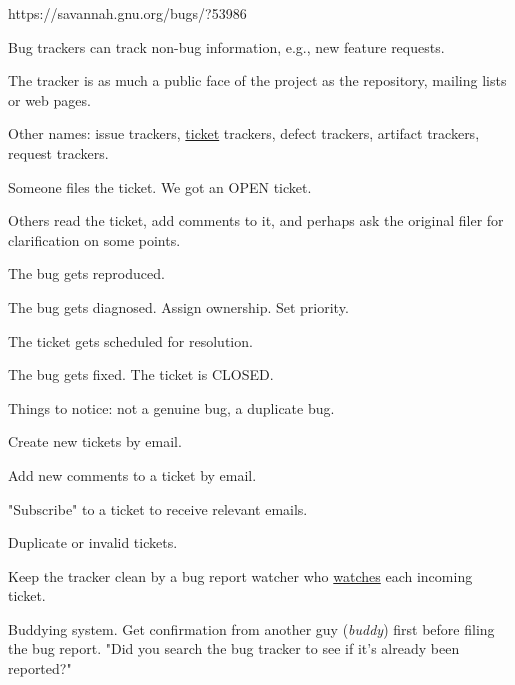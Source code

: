 \documentclass[landscape,30pt]{foils}
\begin{document}
https://savannah.gnu.org/bugs/?53986

Bug trackers can track non-bug information, e.g., new feature requests.

The tracker is as much a public face of the project as the repository, mailing lists or web pages.

Other names:  issue trackers, \underline{ticket} trackers, defect trackers, artifact trackers, request trackers.


Someone files the ticket.  We got an OPEN ticket.

Others read the ticket, add comments to it, and perhaps ask the original filer for clarification on some points.

The bug gets reproduced.

The bug gets diagnosed.  Assign ownership.  Set priority.

The ticket gets scheduled for resolution.

The bug gets fixed.  The ticket is CLOSED.

Things to notice: not a genuine bug, a duplicate bug.



Create new tickets by email.

Add new comments to a ticket by email.

"Subscribe" to a ticket to receive relevant emails.


Duplicate or invalid tickets.

Keep the tracker clean by a bug report watcher who \underline{watches} each incoming ticket.

Buddying system.  Get confirmation from another guy ({\em buddy}) first before filing the bug report.  "Did
you search the bug tracker to see if it's already been reported?"



\end{document}

